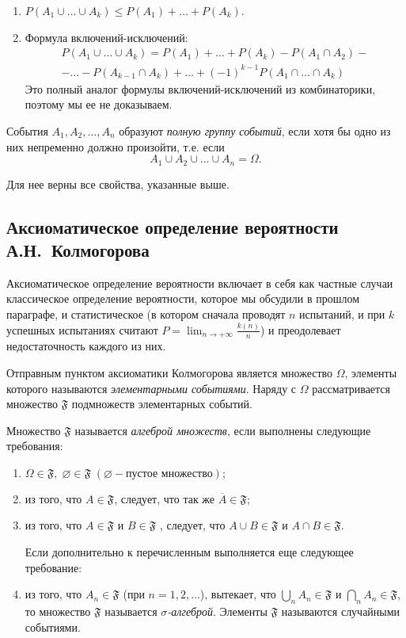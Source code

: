 \begin{enumerate}
\item
$P(A_1\cup\dots\cup A_k) \le P(A_1)+\dots+P(A_k)$.

\item Формула вклю\-чений-исключений:
\begin{multline*}
P(A_1\cup\dots\cup A_k)= P(A_1)+\dots+P(A_k)-P(A_1\cap A_2)-\\-\dots -P(A_{k-1}\cap A_{k})+ \dots + (-1)^{k-1}P(A_1\cap\dots\cap A_k)
\end{multline*}
Это полный аналог формулы вклю\-чений-исключений из комбинаторики, поэтому мы ее не доказываем.
\end{enumerate}

\begin{defn}
События $A_1, A_2,  \dots, A_n$ образуют \textit{полную группу событий}, если хотя бы одно из них непременно должно произойти, т.е. если
$$
A_1\cup A_2\cup\dots\cup A_n=\Omega.
$$
\end{defn}
Для нее верны все свойства, указанные выше.

\subsection{Аксиоматическое определение вероятности А.Н.~Колмогорова}

Аксиоматическое определение вероятности включает в себя как частные случаи классическое определение вероятности, которое мы обсудили в прошлом параграфе, и статистическое (в котором сначала проводят $n$ испытаний, и при $k$ успешных испытаниях считают $P=\lim_{n \to +\infty}\limits\frac{k(n)}{n}$) и преодолевает недостаточность каждого из них.

Отправным пунктом аксиоматики Колмогорова является множество $\Omega$, элементы которого называются \textit{элементарными событиями}. Наряду с $\Omega$ рассматривается множество $\mathfrak{F}$ подмножеств элементарных событий. 
\begin{defn} Множество $\mathfrak{F}$ называется \textit{алгеброй множеств}, если выполнены следующие требования:
\begin{enumerate}
\item
$\Omega \in \mathfrak{F},\; \varnothing \in \mathfrak{F} \;(\varnothing - \text{пустое множество});$
\item
из того, что $A \in \mathfrak{F}$, следует, что так же $\overline{A} \in \mathfrak{F}$;
\item
из того, что  $A \in \mathfrak{F}$ и $B \in \mathfrak{F}$ , следует, что $A \cup B \in \mathfrak{F}$ и $A \cap B \in \mathfrak{F}$.

Если дополнительно к перечисленным выполняется еще следующее требование:
\item
из того, что $A_n \in \mathfrak{F}$ (при $n = 1,2, \ldots$), вытекает, что $\bigcup\limits_{n} A_n \in \mathfrak{F}$ и $\bigcap\limits_{n} A_n \in \mathfrak{F}$, то множество $\mathfrak{F}$ называется \textit{$\sigma$-алгеброй}. Элементы $\mathfrak{F}$ называются случайными событиями.
\end{enumerate}
\end{defn}

